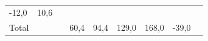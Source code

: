 \begin{longtable}[]{@{}lllllllll@{}}
\begin{minipage}[t]{0.11\columnwidth}
-12,0\strut
\end{minipage} & \begin{minipage}[t]{0.14\columnwidth}\raggedright
10,6\strut
\end{minipage}\tabularnewline
\begin{minipage}[t]{0.05\columnwidth}\raggedright
Total\strut
\end{minipage} & \begin{minipage}[t]{0.08\columnwidth}\raggedright
\strut
\end{minipage} & \begin{minipage}[t]{0.05\columnwidth}\raggedright
\strut
\end{minipage} & \begin{minipage}[t]{0.10\columnwidth}\raggedright
60,4\strut
\end{minipage} & \begin{minipage}[t]{0.10\columnwidth}\raggedright
94,4\strut
\end{minipage} & \begin{minipage}[t]{0.07\columnwidth}\raggedright
129,0\strut
\end{minipage} & \begin{minipage}[t]{0.07\columnwidth}\raggedright
168,0\strut
\end{minipage} & \begin{minipage}[t]{0.11\columnwidth}\raggedright
-39,0\strut
\end{minipage} & \begin{minipage}[t]{0.14\columnwidth}\raggedright
\strut
\end{minipage}\tabularnewline
\bottomrule
\end{longtable}

